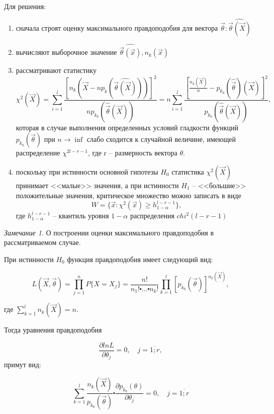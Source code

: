 \documentclass[a4paper, 12pt]{article}
\theoremstyle{definition}
\theoremstyle{leads}
\theoremstyle{example}
\theoremstyle{remark}
\newtheorem{remark}{Замечание}
\begin{document}
Для решения:

\begin{enumerate}
	\item сначала строят оценку максимального правдоподобия для вектора $\vec{\theta} : \hat{\vec{\theta}(\vec{X})}$
	\item вычисляют выборочное значение $\hat{\vec{\theta}(\vec{x})}, n_k(\vec{x})$
	\item рассматривают статистику 
	 \begin{equation*}
	 	\chi^2(\vec{X}) = \sum_{i=1}^{l} \frac{[n_k(\vec{X} - np_k(\hat{\vec{\theta}(\vec{X})}))]^2}{np_{k_0}(\hat{\vec{\theta}}(\vec{X}))} = n \sum_{i=1}^{l}\frac{[\frac{n_k(\vec{X})}{n} - p_{k_0}(\hat{\vec{\theta}})(\vec{X})]^2}{p_{k_0}(\hat{\vec{\theta}}(\vec{X}))},
	 \end{equation*}
	 которая в случае выполнения определенных условий гладкости функций $p_{k_0}(\vec{\theta})$ при $n \longrightarrow \inf$ слабо сходится к случайной величине, имеющей распределение $\chi^{2 l - r - 1}$, где r -- размерность вектора $\theta$.
	 \item поскольку при истинности основной гипотезы $H_0$ статистика $\chi^2(\vec{X})$ принимает <<малые>> значения, а при истинности $H_1$ -- <<большие>> положительные значения, критическое множество можно записать в виде 
	 \begin{equation*}
	 	W = \{\vec{x} : \chi^2(\vec{x}) \geq h_{1 - \alpha}^{l-r-1} \},
	 \end{equation*}
	 где $h_{1 - \alpha}^{l-r-1}$ -- квантиль уровня $1 - \alpha$ распределения $chi^2(l-r-1)$
\end{enumerate}

\begin{remark}
	О построении оценки максимального правдоподобия в рассматриваемом случае.
	
	При истинности $H_0$ функция правдоподобия имеет следующий вид:
	
	\begin{equation*}
		L(\vec{X}, \vec{\theta}) = \prod_{j=1}^{n} P\{X = X_j\} = \frac{n!}{n_1! \centerdot \dots \centerdot n_k!} \prod_{k=1}^{l}[p_{k_0}(\vec{\theta})]^{n_k(\vec{X})},
	\end{equation*}
	
	где  $\sum_{k=1}^{l}n_k(\vec{X}) = n$.
	
	Тогда уравнения правдоподобия
	
	\begin{equation*}
		\frac{\partial ln L}{\partial \theta_j} = 0, \quad j = \overline{1; r},
	\end{equation*}
	примут вид:
	
	\begin{equation*}
		\sum_{k=1}^{l} \frac{n_k(\vec{X})}{p_{k_0}(\vec{\theta})} \centerdot \frac{\partial p_{k_0}(\theta)}{\partial \theta_j} = 0, \quad j = \overline{1; r}
	\end{equation*}
\end{remark}
\end{document}
